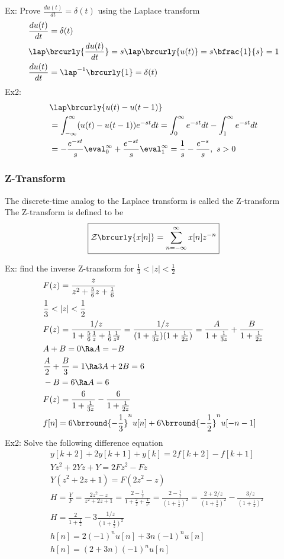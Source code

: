Ex: Prove $\frac{du(t)}{dt}=\delta(t)$ using the Laplace transform
\begin{align*}
    &\frac{du(t)}{dt}=\delta(t)\\
    &\lap\brcurly{\frac{du(t)}{dt}}=s\lap\brcurly{u(t)}=s\bfrac{1}{s}=1\\
    &\frac{du(t)}{dt}=\lap^{-1}\brcurly{1}=\delta(t)
\end{align*}
Ex2:
\begin{align*}
    &\lap\brcurly{u(t)-u(t-1)}\\
    &=\int_{-\infty}^\infty(u(t)-u(t-1))e^{-st}dt=\int_0^\infty e^{-st}dt-\int_1^\infty e^{-st}dt\\
    &=-\frac{e^{-st}}{s}\eval_0^\infty+\frac{e^{-st}}{s}\eval_1^\infty=\frac{1}{s}-\frac{e^{-s}}{s},\ s>0
\end{align*}

\subsubsection{Z-Transform}
The discrete-time analog to the Laplace transform is called the Z-transform\\
The Z-transform is defined to be
$$\boxed{\mathcal{Z}\brcurly{x[n]}=\sum_{n=-\infty}^\infty x[n]z^{-n}}$$

Ex: find the inverse Z-transform for $\frac{1}{3}<|z|<\frac{1}{2}$
\begin{align*}
    &F(z)=\frac{z}{z^2+\frac{5}{6}z+\frac{1}{6}}\\
    &\frac{1}{3}<|z|<\frac{1}{2}\\
    &F(z)=\frac{1/z}{1+\frac{5}{6}\frac{1}{z}+\frac{1}{6}\frac{1}{z^2}}=\frac{1/z}{(1+\frac{1}{3z})(1+\frac{1}{2z})}=\frac{A}{1+\frac{1}{3z}}+\frac{B}{1+\frac{1}{2z}}\\
    &A+B=0\Ra A=-B\\
    &\frac{A}{2}+\frac{B}{3}=1\Ra 3A+2B=6\\
    &-B=6\Ra A=6\\
    &F(z)=\frac{6}{1+\frac{1}{3z}}-\frac{6}{1+\frac{1}{2z}}\\
    &f[n]=6\brround{-\frac{1}{3}}^nu[n]+6\brround{-\frac{1}{2}}^nu[-n-1]
\end{align*}
Ex2: Solve the following difference equation
\begin{align*}
    &y[k+2]+2y[k+1]+y[k]=2f[k+2]-f[k+1]\\
    &Yz^2+2Yz+Y=2Fz^2-Fz\\
    &Y(z^2+2z+1)=F(2z^2-z)\\
    &H=\frac{Y}{F}=\frac{2z^2-z}{z^2+2z+1}=\frac{2-\frac{1}{z}}{1+\frac{2}{z}+\frac{1}{z^2}}=\frac{2-\frac{1}{z}}{(1+\frac{1}{z})^2}=\frac{2+2/z}{(1+\frac{1}{z})^2}-\frac{3/z}{(1+\frac{1}{z})^2}\\
    &H=\frac{2}{1+\frac{1}{z}}-3\frac{1/z}{(1+\frac{1}{z})^2}\\
    &h[n]=2(-1)^nu[n]+3n(-1)^nu[n]\\
    &h[n]=(2+3n)(-1)^nu[n]
\end{align*}